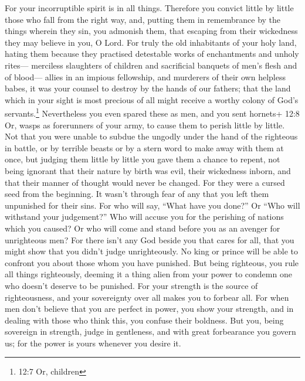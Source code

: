 For your incorruptible spirit is in all things.
 Therefore you convict little by little those who fall from
the right way, and, putting them in remembrance by the things wherein
they sin, you admonish them, that escaping from their wickedness they
may believe in you, O Lord.  For truly the old inhabitants
of your holy land,  hating them because they practised
detestable works of enchantments and unholy rites--- 
merciless slaughters of children and sacrificial banquets of men's flesh
and of blood---  allies in an impious fellowship, and
murderers of their own helpless babes, it was your counsel to destroy by
the hands of our fathers;  that the land which in your sight
is most precious of all might receive a worthy colony of God's
servants.\footnote{12:7 Or, children}  Nevertheless you even
spared these as men, and you sent hornets+ 12:8 Or, wasps as forerunners
of your army, to cause them to perish little by little.  Not
that you were unable to subdue the ungodly under the hand of the
righteous in battle, or by terrible beasts or by a stern word to make
away with them at once,  but judging them little by little
you gave them a chance to repent, not being ignorant that their nature
by birth was evil, their wickedness inborn, and that their manner of
thought would never be changed.  For they were a cursed
seed from the beginning. It wasn't through fear of any that you left
them unpunished for their sins.  For who will say, ``What
have you done?'' Or ``Who will withstand your judgement?'' Who will
accuse you for the perishing of nations which you caused? Or who will
come and stand before you as an avenger for unrighteous men?
 For there isn't any God beside you that cares for all,
that you might show that you didn't judge unrighteously. 
No king or prince will be able to confront you about those whom you have
punished.  But being righteous, you rule all things
righteously, deeming it a thing alien from your power to condemn one who
doesn't deserve to be punished.  For your strength is the
source of righteousness, and your sovereignty over all makes you to
forbear all.  For when men don't believe that you are
perfect in power, you show your strength, and in dealing with those who
think this, you confuse their boldness.  But you, being
sovereign in strength, judge in gentleness, and with great forbearance
you govern us; for the power is yours whenever you desire it.
